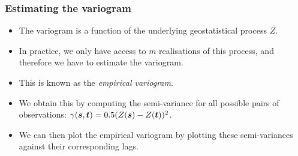 \documentclass[parskip,12pt]{beamer}
\newcommand{\bd}[1]{\ensuremath{\mbox{\boldmath $#1$}}}
\begin{document}
\begin{frame}
\frametitle{Estimating the variogram}
 \begin{itemize}
\item The variogram is a function of the underlying geostatistical process $Z$.
\vspace{3mm}
\item In practice, we only have access to $m$ realisations of this process, and therefore we have to estimate the variogram.
\vspace{3mm}
\item This is known as the \emph{empirical variogram}.
\vspace{3mm}
\item We obtain this by computing the semi-variance for all possible pairs of observations: $\gamma(\bd{s}, \bd{t}) = 0.5(Z(\bd{s}) - Z(\bd{t}))^2$.
\vspace{3mm}
\item We can then plot the empirical variogram by plotting these semi-variances against their corresponding lags.
\end{itemize}
\end{frame}
\end{document}
